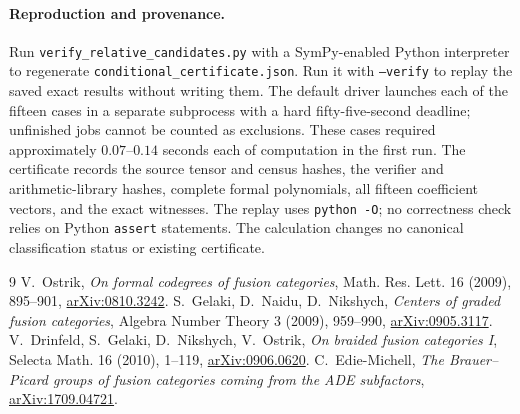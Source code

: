 \documentclass[11pt]{article}
\begin{document}
\paragraph{Reproduction and provenance.}
Run \texttt{verify\_relative\_candidates.py} with a SymPy-enabled
Python interpreter to regenerate \texttt{conditional\_certificate.json}.
Run it with \texttt{--verify} to replay the saved exact results without
writing them. The default driver launches each of the fifteen cases
in a separate subprocess with a hard fifty-five-second deadline;
unfinished jobs cannot be counted as exclusions. These cases required
approximately $0.07$--$0.14$ seconds each of computation in the first
run. The certificate records the source tensor and census hashes, the
verifier and arithmetic-library hashes, complete formal polynomials,
all fifteen coefficient vectors, and the exact witnesses. The replay
uses \texttt{python -O}; no correctness check relies on Python
\texttt{assert} statements. The calculation changes no canonical
classification status or existing certificate.
\begin{thebibliography}{9}
 V.~Ostrik,
\emph{On formal codegrees of fusion categories},
Math. Res. Lett. 16 (2009), 895--901,
\href{https://arxiv.org/abs/0810.3242}{arXiv:0810.3242}.
 S.~Gelaki, D.~Naidu, D.~Nikshych,
\emph{Centers of graded fusion categories},
Algebra Number Theory 3 (2009), 959--990,
\href{https://arxiv.org/abs/0905.3117}{arXiv:0905.3117}.
 V.~Drinfeld, S.~Gelaki, D.~Nikshych, V.~Ostrik,
\emph{On braided fusion categories I},
Selecta Math. 16 (2010), 1--119,
\href{https://arxiv.org/abs/0906.0620}{arXiv:0906.0620}.
 C.~Edie-Michell,
\emph{The Brauer--Picard groups of fusion categories coming from the
ADE subfactors},
\href{https://arxiv.org/abs/1709.04721}{arXiv:1709.04721}.
\end{thebibliography}
\end{document}
